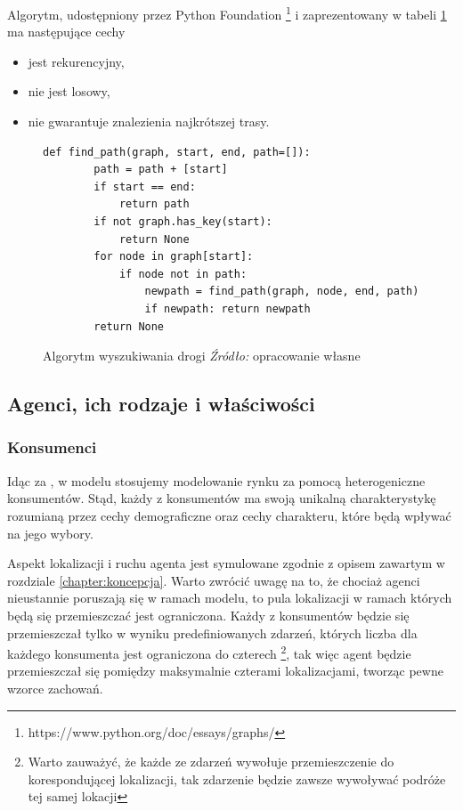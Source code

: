 \documentclass[polish, twoside, 12pt, a4paper]{article}
\theoremstyle{definition}
\theoremstyle{plain}
\theoremstyle{remark}
\begin{document}
Algorytm, udostępniony przez Python Foundation \footnote{https://www.python.org/doc/essays/graphs/} i zaprezentowany w tabeli \ref{fig:wayfinding} ma następujące cechy
	\begin{itemize}
		\item jest rekurencyjny,
		\item nie jest losowy,
		\item nie gwarantuje znalezienia najkrótszej trasy.
	\end{itemize}


\begin{figure}[hbt]
  \centering
\begin{lstlisting}[frame=single, label=szukaniedrogi]  
    def find_path(graph, start, end, path=[]):
        path = path + [start]
        if start == end:
            return path
        if not graph.has_key(start):
            return None
        for node in graph[start]:
            if node not in path:
                newpath = find_path(graph, node, end, path)
                if newpath: return newpath
        return None
\end{lstlisting}
  \captionsetup{margin=10pt,font=small,labelfont=bf,width=.8\textwidth}
  \caption[Algorytm wyszukiwania drogi]{Algorytm wyszukiwania drogi \textit{Źródło:} opracowanie własne}\label{fig:wayfinding}
\end{figure}


\subsection{Agenci, ich rodzaje i właściwości}
\subsubsection{Konsumenci} \label{chapter:konsumenci}

Idąc za \cite{Kaminski2012}, w modelu stosujemy modelowanie rynku za pomocą heterogeniczne konsumentów. Stąd, każdy z konsumentów ma swoją unikalną charakterystykę rozumianą przez cechy demograficzne oraz cechy charakteru, które będą wpływać na jego wybory. 

Aspekt lokalizacji i ruchu agenta jest symulowane zgodnie z opisem zawartym w rozdziale \ref{chapter:koncepcja}. Warto zwrócić uwagę na to, że chociaż agenci nieustannie poruszają się w ramach modelu, to pula lokalizacji w ramach których będą się przemieszczać jest ograniczona. Każdy z konsumentów będzie się przemieszczał tylko w wyniku predefiniowanych zdarzeń, których liczba dla każdego konsumenta jest ograniczona do czterech \footnote{Warto zauważyć, że każde ze zdarzeń wywołuje przemieszczenie do korespondującej lokalizacji, tak zdarzenie będzie zawsze wywoływać podróże tej samej lokacji}, tak więc agent będzie przemieszczał się pomiędzy maksymalnie czterami lokalizacjami, tworząc pewne wzorce zachowań. 
\end{document}
